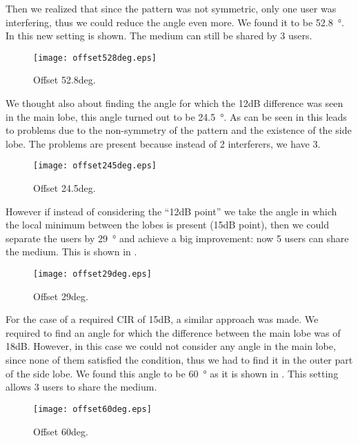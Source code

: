 Then we realized that since the pattern was not symmetric, only one user was interfering, thus we could reduce the angle even more. We found it to be \SI{52.8}{\degree}. In  this new setting is shown. The medium can still be shared by 3 users.

\begin{figure}[!h]
  \centering
  \texttt{[image: offset528deg.eps]}
  \caption{Offset 52.8deg.}
  \label{fig:offset528deg}
\end{figure}

We thought also about finding the angle for which the 12dB difference was seen in the main lobe, this angle turned out to be \SI{24.5}{\degree}. As can be seen in  this leads to problems due to the non-symmetry of the pattern and the existence of the side lobe. The problems are present because instead of 2 interferers, we have 3.


\begin{figure}[!h]
  \centering
  \texttt{[image: offset245deg.eps]}
  \caption{Offset 24.5deg.}
  \label{fig:offset245deg}
\end{figure}

However if instead of considering the ``12dB point'' we take the angle in which the local minimum between the lobes is present (15dB point), then we could separate the users by \SI{29}{\degree} and achieve a big improvement: now 5 users can share the medium. This is shown in .

\begin{figure}[!h]
  \centering
  \texttt{[image: offset29deg.eps]}
  \caption{Offset 29deg.}
  \label{fig:offset29deg}
\end{figure}


For the case of a required CIR of 15dB, a similar approach was made. We required to find an angle for which the difference between the main lobe was of 18dB. However, in this case we could not consider any angle in the main lobe, since none of them satisfied the condition, thus we had to find it in the outer part of the side lobe. We found this angle to be \SI{60}{\degree} as it is shown in . This setting allows 3 users to share the medium.

\begin{figure}[!h]
  \centering
  \texttt{[image: offset60deg.eps]}
  \caption{Offset 60deg.}
  \label{fig:offset60deg}
\end{figure}

